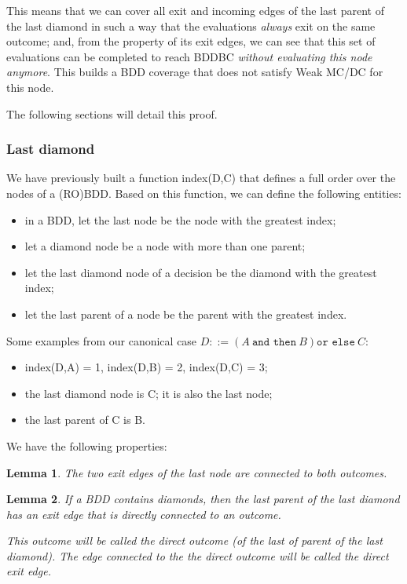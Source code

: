 \documentclass[a4paper,12pt,twoside]{article}
\newcommand{\andthen}{\texttt{and then}}
\newcommand{\orelse}{\texttt{or else}}
\newtheorem{lemma}{Lemma}[subsection]
\begin{document}
This means that we can cover all exit and incoming edges of the last
parent of the last diamond in such a way that the evaluations \textit{always}
exit on the same outcome; and, from the property of its exit edges, we
can see that this set of evaluations can be completed to reach BDDBC
\textit{without evaluating this node anymore}. This builds a BDD coverage
that does not satisfy Weak MC/DC for this node.

The following sections will detail this proof.

\subsubsection{Last diamond}

We have previously built a function index(D,C) that defines a full
order over the nodes of a (RO)BDD. Based on this function, we can
define the following entities:
\begin{itemize}
\item in a BDD, let the last node be the node with the greatest index;
\item let a diamond node be a node with more than one parent;
\item let the last diamond node of a decision be the diamond with the
      greatest index;
\item let the last parent of a node be the parent with the greatest index.
\end{itemize}

Some examples from our canonical case
$D ::= (A \ \andthen{} \ B) \orelse{} \ C$:
\begin{itemize}
\item index(D,A) = 1, index(D,B) = 2, index(D,C) = 3;
\item the last diamond node is C; it is also the last node;
\item the last parent of C is B.
\end{itemize}

We have the following properties:

\begin{lemma}
  \label{lemma:last-node}
  The two exit edges of the last node are connected to both outcomes.
\end{lemma}

\begin{lemma}
  \label{lemma:last-parent-of-the-last-diamond}
   If a BDD contains diamonds, then the last parent of the last diamond
   has an exit edge that is directly connected to an outcome.

   This outcome will be called the direct outcome (of the last of parent of
   the last diamond). The edge connected to the the direct outcome will be
   called the direct exit edge.
\end{lemma}
\end{document}
